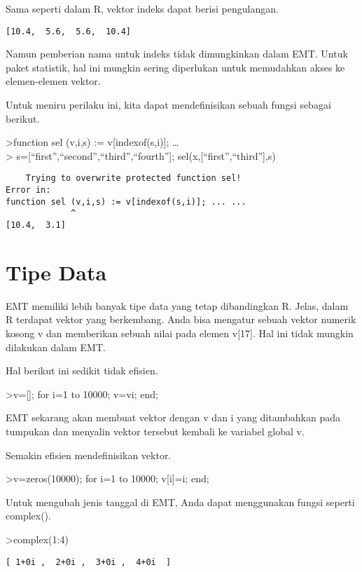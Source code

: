 \documentclass[
]{book}
\begin{document}
Sama seperti dalam R, vektor indeks dapat berisi pengulangan.

\begin{verbatim}
[10.4,  5.6,  5.6,  10.4]
\end{verbatim}

Namun pemberian nama untuk indeks tidak dimungkinkan dalam EMT. Untuk paket statistik, hal ini mungkin sering diperlukan untuk memudahkan akses ke elemen-elemen vektor.

Untuk meniru perilaku ini, kita dapat mendefinisikan sebuah fungsi sebagai berikut.

\textgreater function sel (v,i,s) := v{[}indexof(s,i){]}; \ldots{}\\
\textgreater{} s={[}``first'',``second'',``third'',``fourth''{]}; sel(x,{[}``first'',``third''{]},s)

\begin{verbatim}
    Trying to overwrite protected function sel!
Error in:
function sel (v,i,s) := v[indexof(s,i)]; ... ...
             ^
[10.4,  3.1]
\end{verbatim}

\section{Tipe Data}\label{tipe-data}

EMT memiliki lebih banyak tipe data yang tetap dibandingkan R. Jelas, dalam R terdapat vektor yang berkembang. Anda bisa mengatur sebuah vektor numerik kosong v dan memberikan sebuah nilai pada elemen v{[}17{]}. Hal ini tidak mungkin dilakukan dalam EMT.

Hal berikut ini sedikit tidak efisien.

\textgreater v={[}{]}; for i=1 to 10000; v=v\textbar i; end;

EMT sekarang akan membuat vektor dengan v dan i yang ditambahkan pada tumpukan dan menyalin vektor tersebut kembali ke variabel global v.

Semakin efisien mendefinisikan vektor.

\textgreater v=zeros(10000); for i=1 to 10000; v{[}i{]}=i; end;

Untuk mengubah jenis tanggal di EMT, Anda dapat menggunakan fungsi seperti complex().

\textgreater complex(1:4)

\begin{verbatim}
[ 1+0i ,  2+0i ,  3+0i ,  4+0i  ]
\end{verbatim}
\end{document}
